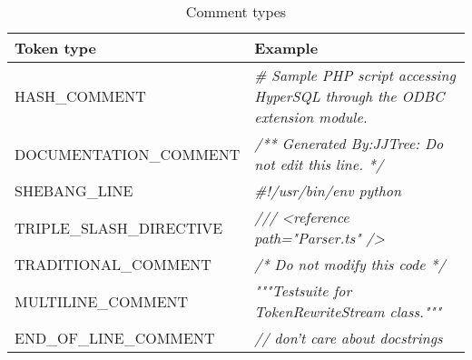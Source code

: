 \setlength{\extrarowheight}{.5em}
\begin{table}[H]
	\caption{Comment types}
	\label{table:commentTypes}
	\begin{tabularx}{\textwidth}{l|L}
		\textbf{Token type} & \textbf{Example} \\
		\hline
		HASH\_COMMENT & \textit{\# Sample PHP script accessing HyperSQL through the ODBC extension module.}\\ 
		DOCUMENTATION\_COMMENT & \textit{/** Generated By:JJTree: Do not edit this line. */} \\ 
		SHEBANG\_LINE & \textit{\#!/usr/bin/env python } \\ 
		TRIPLE\_SLASH\_DIRECTIVE & \textit{/// <reference path="Parser.ts" />} \\ 
		TRADITIONAL\_COMMENT & \textit{/* Do not modify this code */} \\ 
		MULTILINE\_COMMENT & \textit{"""Testsuite for TokenRewriteStream class."""} \\ 
		END\_OF\_LINE\_COMMENT & \textit{// don't care about docstrings}
	\end{tabularx} 
\end{table}
\setlength{\extrarowheight}{0em}